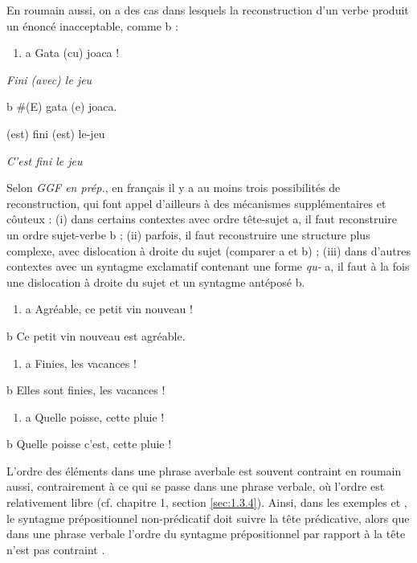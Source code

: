 En roumain aussi, on a des cas dans lesquels la reconstruction d'un verbe produit un énoncé inacceptable, comme b :


\begin{enumerate}
\item \label{bkm:Ref283990469}a  Gata (cu) joaca !


\end{enumerate}
{\itshape
Fini (avec) le jeu}

b  \#(E)  gata  (e)  joaca.

  (est)  fini  (est)  le-jeu

    \textit{C'est fini le jeu}

Selon \textit{GGF en prép.}, en français il y a au moins trois possibilités de reconstruction, qui font appel d'ailleurs à des mécanismes supplémentaires et côuteux : (i) dans certains contextes avec ordre tête-sujet a, il faut reconstruire un ordre sujet-verbe b ; (ii) parfois, il faut reconstruire une structure plus complexe, avec dislocation à droite du sujet (comparer a et b) ; (iii) dans d'autres contextes avec un syntagme exclamatif contenant une forme \textit{qu-} a, il faut à la fois une dislocation à droite du sujet et un syntagme antéposé b.


\begin{enumerate}
\item \label{bkm:Ref302631645}a  Agréable, ce petit vin nouveau !  


\end{enumerate}
b  Ce petit vin nouveau est agréable.


\begin{enumerate}
\item \label{bkm:Ref302631695}a  Finies, les vacances !  


\end{enumerate}
b  Elles sont finies, les vacances !


\begin{enumerate}
\item \label{bkm:Ref302631718}a  Quelle poisse, cette pluie !  


\end{enumerate}
b  Quelle poisse c'est, cette pluie !

L'ordre des éléments dans une phrase averbale est souvent contraint en roumain aussi, contrairement à ce qui se passe dans une phrase verbale, où l'ordre est relativement libre (cf. chapitre 1, section \ref{sec:1.3.4}). Ainsi, dans les exemples  et , le syntagme prépositionnel non-prédicatif doit suivre la tête prédicative, alors que dans une phrase verbale l'ordre du syntagme prépositionnel par rapport à la tête n'est pas contraint .


